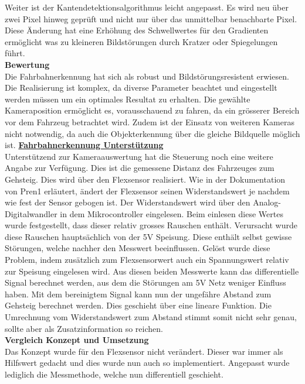 Weiter ist der Kantendetektionsalgorithmus leicht angepasst. Es wird neu über zwei Pixel hinweg geprüft und nicht nur über das unmittelbar benachbarte Pixel. Diese Änderung hat eine Erhöhung des Schwellwertes für den Gradienten ermöglicht was zu kleineren Bildstörungen durch Kratzer oder Spiegelungen führt.\\[0.2cm]
\textbf{Bewertung}\\[0.2cm]
Die Fahrbahnerkennung hat sich als robust und Bildstörungsresistent erwiesen. Die Realisierung ist komplex, da diverse Parameter beachtet und eingestellt werden müssen um ein optimales Resultat zu erhalten. Die gewählte Kameraposition ermöglicht es, vorausschauend zu fahren, da ein grösserer Bereich vor dem Fahrzeug betrachtet wird. Zudem ist der Einsatz von weiteren Kameras nicht notwendig, da auch die Objekterkennung über die gleiche Bildquelle möglich ist.
\newpage
\underline{\textbf{Fahrbahnerkennung Unterstützung}}\\[0.2cm]
Unterstützend zur Kameraauswertung hat die Steuerung noch eine weitere Angabe zur Verfügung. Dies ist die gemessene Distanz des Fahrzeuges zum Gehsteig. Dies wird über den Flexsensor realisiert. Wie in der Dokumentation von Pren1 erläutert, ändert der Flexsensor seinen Widerstandswert je nachdem wie fest der Sensor gebogen ist. Der Widerstandswert wird über den Analog-Digitalwandler in dem Mikrocontroller eingelesen. Beim einlesen diese Wertes wurde festgestellt, dass dieser relativ grosses Rauschen enthält. Verursacht wurde diese Rauschen hauptsächlich von der 5V Speisung. Diese enthält selbst gewisse Störungen, welche nachher den Messwert beeinflussen. Gelöst wurde diese Problem, indem zusätzlich zum Flexsensorwert auch ein Spannungswert relativ zur Speisung eingelesen wird. Aus diesen beiden Messwerte kann das differentielle Signal berechnet werden, aus dem die Störungen am 5V Netz weniger Einfluss haben. Mit dem bereinigtem Signal kann nun der ungefähre Abstand zum Gehsteig berechnet werden. Dies geschieht über eine lineare Funktion. Die Umrechnung vom Widerstandswert zum Abstand stimmt somit nicht sehr genau, sollte aber als Zusatzinformation so reichen.%
\\[0.2cm]
\textbf{Vergleich Konzept und Umsetzung}\\[0.2cm]
Das Konzept wurde für den Flexsensor nicht verändert. Dieser war immer als Hilfswert gedacht und dies wurde nun auch so implementiert. Angepasst wurde lediglich die Messmethode, welche nun differentiell geschieht.